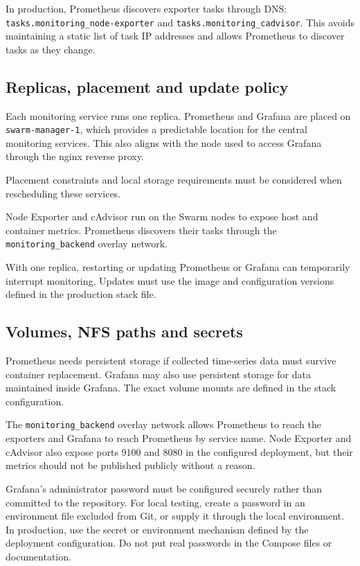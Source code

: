 In production, Prometheus discovers exporter tasks through DNS:
\texttt{tasks.monitoring\_node-exporter} and
\texttt{tasks.monitoring\_cadvisor}. This avoids maintaining a static
list of task IP addresses and allows Prometheus to discover tasks as
they change.

\subsection{Replicas, placement and update policy}
Each monitoring service runs one replica. Prometheus and Grafana are
placed on \texttt{swarm-manager-1}, which provides a predictable
location for the central monitoring services. This also aligns with
the node used to access Grafana through the nginx reverse proxy.

Placement constraints and local storage requirements must be
considered when rescheduling these services.

Node Exporter and cAdvisor run on the Swarm nodes to expose host and
container metrics. Prometheus discovers their tasks through the
\texttt{monitoring\_backend} overlay network.

With one replica, restarting or updating Prometheus or Grafana can
temporarily interrupt monitoring. Updates must use the image and
configuration versions defined in the production stack file.

\subsection{Volumes, NFS paths and secrets}
Prometheus needs persistent storage if collected time-series data
must survive container replacement. Grafana may also use persistent
storage for data maintained inside Grafana. The exact volume mounts
are defined in the stack configuration.

The \texttt{monitoring\_backend} overlay network allows Prometheus
to reach the exporters and Grafana to reach Prometheus by service
name. Node Exporter and cAdvisor also expose ports 9100 and 8080
in the configured deployment, but their metrics should not be
published publicly without a reason.

Grafana's administrator password must be configured securely rather
than committed to the repository. For local testing, create a password
in an environment file excluded from Git, or supply it through the
local environment. In production, use the secret or environment
mechanism defined by the deployment configuration. Do not put real
passwords in the Compose files or documentation.

